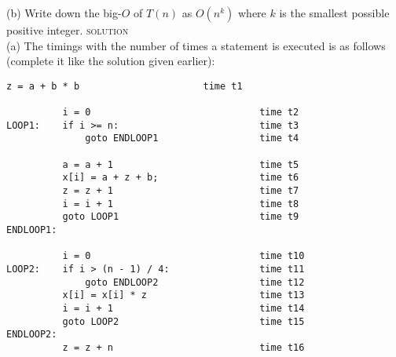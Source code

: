 (b) Write down the big-$O$ of $T(n)$ as $O(n^k)$
where $k$ is the smallest possible  positive integer.
\newpage
\textsc{solution}\\
(a) The timings with the number of times a statement is executed
is as follows (complete it like the solution given earlier):
\begin{Verbatim}[frame=single]
          z = a + b * b                      time t1

          i = 0                              time t2
LOOP1:    if i >= n:                         time t3
              goto ENDLOOP1                  time t4
 
          a = a + 1                          time t5
          x[i] = a + z + b;                  time t6
          z = z + 1                          time t7
          i = i + 1                          time t8
          goto LOOP1                         time t9
ENDLOOP1:

          i = 0                              time t10
LOOP2:    if i > (n - 1) / 4:                time t11
              goto ENDLOOP2                  time t12
          x[i] = x[i] * z                    time t13
          i = i + 1                          time t14
          goto LOOP2                         time t15
ENDLOOP2:
          z = z + n                          time t16   
\end{Verbatim}


